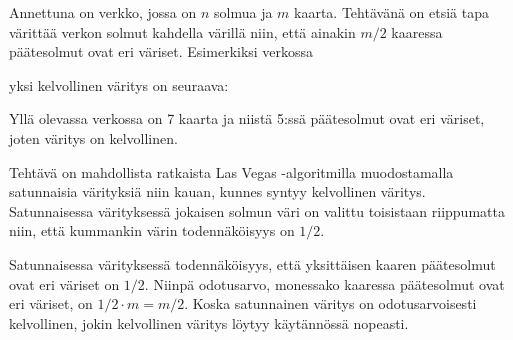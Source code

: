 Annettuna on verkko, jossa on $n$ solmua ja $m$ kaarta.
Tehtävänä on etsiä tapa värittää verkon solmut kahdella värillä
niin, että ainakin $m/2$ kaaressa
päätesolmut ovat eri väriset.
Esimerkiksi verkossa
\begin{center}
\end{center}
yksi kelvollinen väritys on seuraava:
\begin{center}
\end{center}
Yllä olevassa verkossa on 7 kaarta ja niistä 5:ssä
päätesolmut ovat eri väriset,
joten väritys on kelvollinen.

Tehtävä on mahdollista ratkaista Las Vegas -algoritmilla
muodostamalla satunnaisia värityksiä niin kauan,
kunnes syntyy kelvollinen väritys.
Satunnaisessa värityksessä jokaisen solmun väri on
valittu toisistaan riippumatta niin,
että kummankin värin todennäköisyys on $1/2$.

Satunnaisessa värityksessä todennäköisyys, että yksittäisen kaaren päätesolmut
ovat eri väriset on $1/2$. Niinpä odotusarvo, monessako kaaressa
päätesolmut ovat eri väriset, on $1/2 \cdot m = m/2$.
Koska satunnainen väritys on odotusarvoisesti kelvollinen,
jokin kelvollinen väritys löytyy käytännössä nopeasti.

